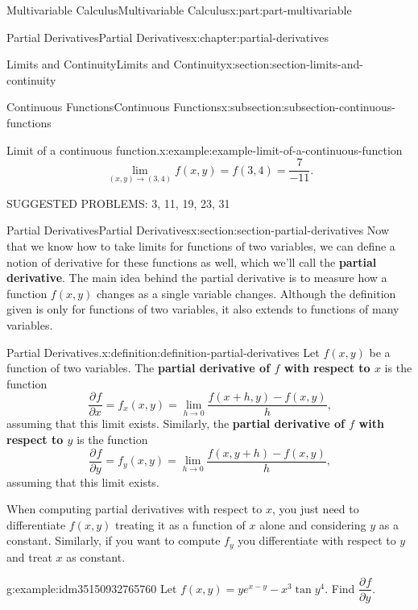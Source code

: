 \documentclass[twoside,10pt,]{tufte-book}
\newcommand{\terminology}[1]{\textbf{#1}}
\numberwithin{equation}{part}
\newcommand{\pdv}[3][]{\dfrac{\partial^{#1} #2}{\partial #3^{#1}}}
\begin{document}
\begin{partptx}{Multivariable Calculus}{}{Multivariable Calculus}{}{}{x:part:part-multivariable}
\begin{chapterptx}{Partial Derivatives}{}{Partial Derivatives}{}{}{x:chapter:partial-derivatives}
\begin{sectionptx}{Limits and Continuity}{}{Limits and Continuity}{}{}{x:section:section-limits-and-continuity}
\begin{subsectionptx}{Continuous Functions}{}{Continuous Functions}{}{}{x:subsection:subsection-continuous-functions}
\begin{example}{Limit of a continuous function.}{x:example:example-limit-of-a-continuous-function}
\begin{equation*}
\lim_{(x,y)\to(3,4)}f(x,y) = f(3,4) = \frac{7}{-11}.
\end{equation*}
%
\end{example}
\end{subsectionptx}
\begin{conclusion}{}%
SUGGESTED PROBLEMS: 3, 11, 19, 23, 31%
\end{conclusion}%
\end{sectionptx}
%
%
\typeout{************************************************}
\typeout{************************************************}
%
\begin{sectionptx}{Partial Derivatives}{}{Partial Derivatives}{}{}{x:section:section-partial-derivatives}
Now that we know how to take limits for functions of two variables, we can define a notion of derivative for these functions as well, which we'll call the \terminology{partial derivative}. The main idea behind the partial derivative is to measure how a function \(f(x,y)\) changes as a single variable changes. Although the definition given is only for functions of two variables, it also extends to functions of many variables.\begin{definition}{Partial Derivatives.}{x:definition:definition-partial-derivatives}%
%
Let \(f(x,y)\) be a function of two variables. The \terminology{partial derivative of \(f\) with respect to \(x\)} is the function%
\begin{equation*}
\pdv{f}{x} = f_{x}(x,y) = \lim_{h\to0}\frac{f(x+h,y)-f(x,y)}{h}\text{,}
\end{equation*}
assuming that this limit exists. Similarly, the \terminology{partial derivative of \(f\) with respect to \(y\)} is the function%
\begin{equation*}
\pdv{f}{y} = f_{y}(x,y) = \lim_{h\to0}\frac{f(x,y+h)-f(x,y)}{h}\text{,}
\end{equation*}
assuming that this limit exists.%
\end{definition}
When computing partial derivatives with respect to \(x\), you just need to differentiate \(f(x,y)\) treating it as a function of \(x\) alone and considering \(y\) as a constant. Similarly, if you want to compute \(f_{y}\) you differentiate with respect to \(y\) and treat \(x\) as constant.%
\begin{example}{}{g:example:idm35150932765760}%
Let \(f(x,y) = ye^{x-y} - x^{3}\tan y^{4}\). Find \(\pdv{f}{y}\).%
\par\smallskip%

\end{example}
\end{sectionptx}
\end{chapterptx}
\end{partptx}
\end{document}
